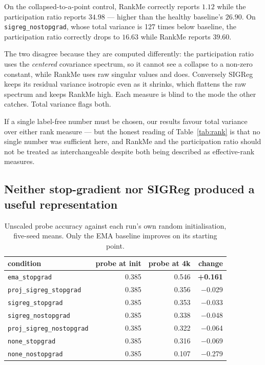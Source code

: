 \ours{} On the collapsed-to-a-point control, RankMe correctly reports $1.12$ while the
participation ratio reports $34.98$ --- higher than the healthy baseline's $26.90$. On
\texttt{sigreg\_nostopgrad}, whose total variance is 127 times below baseline, the
participation ratio correctly drops to $16.63$ while RankMe reports $39.60$.

\interp{} The two disagree because they are computed differently: the participation ratio
uses the \emph{centered} covariance spectrum, so it cannot see a collapse to a non-zero
constant, while RankMe uses raw singular values and does. Conversely SIGReg keeps its
residual variance isotropic even as it shrinks, which flattens the raw spectrum and keeps
RankMe high. Each measure is blind to the mode the other catches. Total variance flags both.

\ours{} If a single label-free number must be chosen, our results favour total variance over
either rank measure --- but the honest reading of Table~\ref{tab:rank} is that no single
number was sufficient here, and RankMe and the participation ratio should not be treated as
interchangeable despite both being described as effective-rank measures.

\subsection{Neither stop-gradient nor SIGReg produced a useful representation}

\begin{table}[h]
\centering
\small
\begin{tabular}{l r r r}
\toprule
\textbf{condition} & \textbf{probe at init} & \textbf{probe at 4k} & \textbf{change} \\
\midrule
\texttt{ema\_stopgrad}           & 0.385 & 0.546 & \textbf{+0.161} \\
\texttt{proj\_sigreg\_stopgrad}  & 0.385 & 0.356 & $-$0.029 \\
\texttt{sigreg\_stopgrad}        & 0.385 & 0.353 & $-$0.033 \\
\texttt{sigreg\_nostopgrad}      & 0.385 & 0.338 & $-$0.048 \\
\texttt{proj\_sigreg\_nostopgrad}& 0.385 & 0.322 & $-$0.064 \\
\texttt{none\_stopgrad}          & 0.385 & 0.316 & $-$0.069 \\
\texttt{none\_nostopgrad}        & 0.385 & 0.107 & $-$0.279 \\
\bottomrule
\end{tabular}
\caption{\ours{} Unscaled probe accuracy against each run's own random initialisation,
five-seed means. Only the EMA baseline improves on its starting point.}
\end{table}

